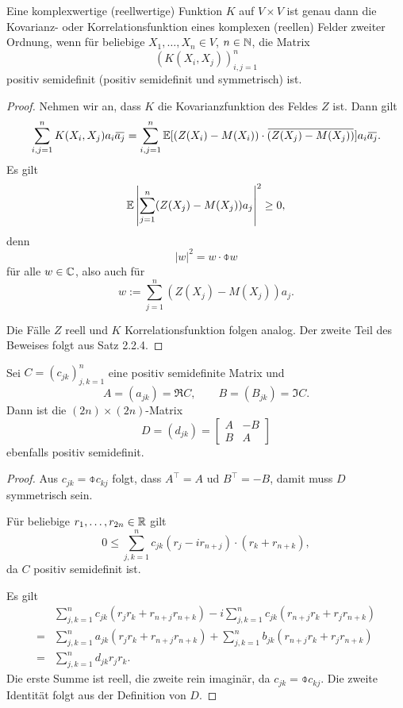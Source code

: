 \documentclass[
 a4paper,
 12pt,
 parskip=half
 ]{scrreprt}
\theoremstyle{plain}
\theoremstyle{definition}
\numberwithin{equation}{section}
\begin{document}
\begin{thm}
  Eine komplexwertige (reellwertige) Funktion $K$ auf $V \times V$ ist genau
  dann die Kovarianz- oder Korrelationsfunktion eines komplexen (reellen) Felder
  zweiter Ordnung, wenn für beliebige $X_1, \ldots, X_n \in V$, $n \in \mathbb{N}$,
  die Matrix
  \[ (K(X_i,X_j))_{i,j=1}^n \]
  positiv semidefinit (positiv semidefinit und symmetrisch) ist.
\end{thm}

\begin{proof}
  Nehmen wir an, dass $K$ die Kovarianzfunktion des Feldes $Z$ ist. Dann gilt
  \[ \sum_{i,j=1}^n K(X_i, X_j) a_i \obar{a_j}
    = \sum_{i,j=1}^n \pE[ (Z(X_i) - M(X_i)) \cdot \obar{(Z(X_j) - M(X_j))}] a_i
    \obar{a_j}. \]
  Es gilt
  \[ \mathbb{E} \left| \sum_{j=1}^n (Z(X_j) - M(X_j)) a_j \right|^2 \ge 0, \]
  denn
  \[ |w|^2 = w \cdot \obar{w} \]
  für alle $w \in \mathbb{C}$, also auch für
  \[ w := \sum_{j=1}^n (Z(X_j) - M(X_j)) a_j. \]

  Die Fälle $Z$ reell und $K$ Korrelationsfunktion folgen analog. Der zweite
  Teil des Beweises folgt aus Satz 2.2.4.
\end{proof}

\begin{lem} %
  Sei $C = (c_{jk})_{j,k=1}^n$ eine positiv semidefinite Matrix und
  \[ A = (a_{jk}) = \Re C, \qquad B = (B_{jk}) = \Im C. \]
  Dann ist die $(2n) \times (2n)$-Matrix
  \[ D = (d_{jk}) = \begin{bmatrix}
      A & -B \\ B & A
    \end{bmatrix}
  \]
  ebenfalls positiv semidefinit.
\end{lem}

\begin{proof}
  Aus $c_{jk} = \obar{c_{kj}}$ folgt, dass $A^\top = A$ ud $B^\top = -B$, damit
  muss $D$ symmetrisch sein.

  Für beliebige $r_1, \ldots, r_{2n} \in \mathbb{R}$ gilt
  \[ 0 \le \sum_{j,k = 1}^n c_{jk}( r_j - i r_{n+j}) \cdot (r_k + r_{n+k}), \]
  da $C$ positiv semidefinit ist.

  Es gilt
  \begin{align*}
    &\sum_{j,k=1}^n c_{jk} (r_j r_k + r_{n+j} r_{n+k}) - i \sum_{j,k=1}^n c_{jk}
    (r_{n+j} r_k + r_j r_{n+k}) \\
    = &\sum_{j,k=1}^n a_{jk} (r_j r_k + r_{n+j} r_{n+k}) + \sum_{j,k=1}^n b_{jk}
        (r_{n+j} r_k + r_j r_{n+k}) \\
    = &\sum_{j,k = 1}^n d_{jk} r_j r_k.
  \end{align*}
  Die erste Summe ist reell, die zweite rein imaginär, da
  $c_{jk} = \obar{c_{kj}}$. Die zweite Identität folgt aus der Definition von
  $D$.
\end{proof}
\end{document}
